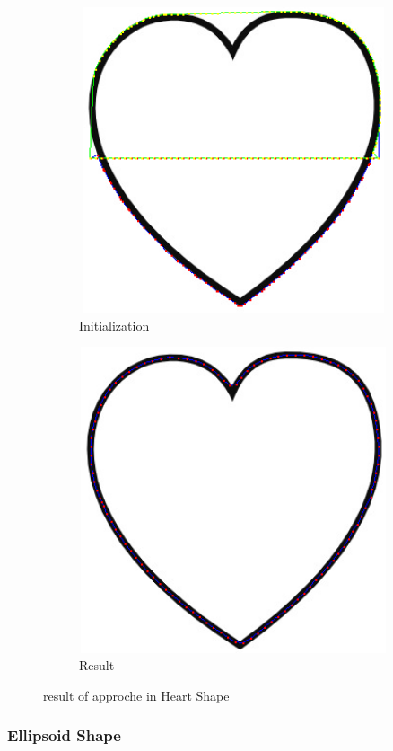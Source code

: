 \begin{figure}[H]\ContinuedFloat
    \begin{subfigure}[b]{1\textwidth}
        \centering
        \includegraphics[width=12cm,height=9cm]{chapiter3/figures/figure 12 b.png}
        \caption{Initialization}
    \end{subfigure}
    \hfill
    \begin{subfigure}[b]{1\textwidth}
        \centering
        \includegraphics[width=12cm,height=9cm]{chapiter3/figures/figure 12 c.png}
        \caption{Result}
    \end{subfigure}
    \caption{result of approche in Heart Shape}
    \label{fig:figure3.11.1}
\end{figure}
\vspace{2cm}
\subsubsection{Ellipsoid Shape}

